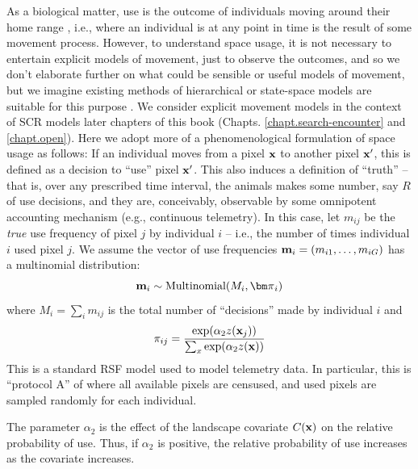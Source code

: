 As a biological matter, use is the outcome of individuals moving
around their home range \citep{hooten_etal:2010}, i.e., where an
individual is at any point in time is the result of some movement
process. However, to understand space usage, it is not necessary to
entertain explicit models of movement, just to observe the outcomes,
and so we don't elaborate further on what could be sensible or useful
models of movement, but we imagine existing methods of hierarchical or
state-space models are suitable for this purpose
\citep{ovaskainen:2004, jonsen_etal:2005, forester_etal:2007,
  ovaskainen_etal:2008, patterson_etal:2008, hooten_etal:2010,
  mcclintock_etal:2012}.  We consider explicit movement models in the
context of SCR models later chapters of this book
(Chapts. \ref{chapt.search-encounter} and \ref{chapt.open}).  Here we
adopt more of a phenomenological formulation of space usage as
follows: If an individual moves from a pixel ${\bf x}$ to another
pixel ${\bf x}'$, this is defined as a decision to ``use'' pixel ${\bf
  x}'$. This also induces a definition of ``truth'' -- that is, over
any prescribed time interval, the animals makes some number, say $R$
of use decisions, and they are, conceivably, observable by some
omnipotent accounting mechanism (e.g., continuous telemetry).  
In this
case, let $m_{ij}$ be the {\it true} use frequency of pixel $j$ by
individual $i$ -- i.e., the number of times individual $i$ used pixel
$j$.  We assume the vector of use frequencies ${\bf m}_{i} =
(m_{i1},\ldots,m_{iG})$ has a multinomial distribution:
\[
{\bf m}_{i} \sim \mbox{Multinomial}(M_{i}, {\bm \pi}_{i})
\]
where $M_{i} = \sum_{i} m_{ij}$ is the total number of ``decisions''
made by individual $i$ and 
\[
 \pi_{ij} = \frac{ \exp( \alpha_{2} z({\bf x}_{j}) ) }{ \sum_{x}
   \exp(\alpha_{2} z({\bf x}))}
\]
This is a standard RSF model \citep{manly_etal:2002} used to model
telemetry data. In particular, this is ``protocol A'' of
\citep{manly_etal:2002} where all available pixels are censused, and
used pixels are sampled randomly for each individual.

The parameter $\alpha_2$ is the effect of the
landscape covariate $C({\bf x})$ on the relative probability of
use. Thus, if $\alpha_2$ is positive, the relative probability of use
increases as the covariate increases.

